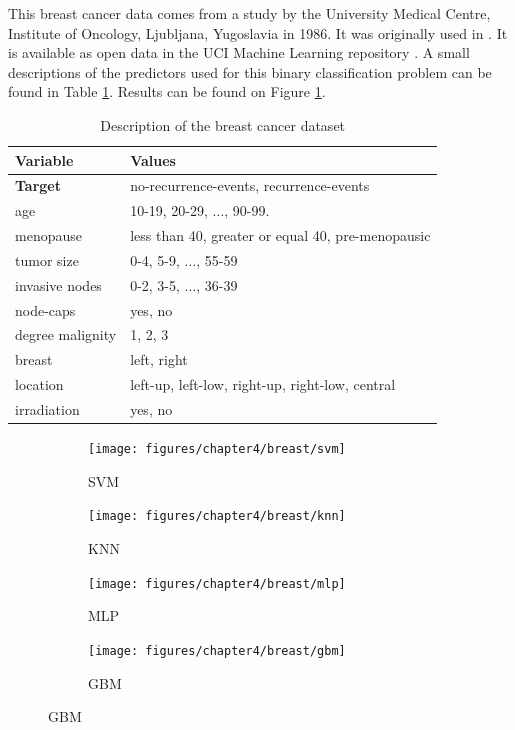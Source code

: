 \documentclass[10pt,a4paper,twoside]{book}
\begin{document}
This breast cancer data comes from a study by the University Medical Centre, Institute of Oncology, Ljubljana, Yugoslavia in 1986. It was originally used in \cite{Michalski1986}. It is available as open data in the UCI Machine Learning repository \cite{Lichman2013}. A small descriptions of the predictors used for this binary classification problem can be found in Table \ref{breastcancer}. Results can be found on Figure \ref{fig:breastcancer}.


\begin{table}[]
\centering
\caption{Description of the breast cancer dataset}
\label{breastcancer}
\begin{tabular}{@{}ll@{}}
\toprule
\textbf{Variable} & \textbf{Values}                                   \\ \midrule
\textbf{Target}   & no-recurrence-events, recurrence-events           \\
age               & 10-19, 20-29, $\dots$, 90-99.                         \\
menopause         & less than 40, greater or equal 40, pre-menopausic \\
tumor size        & 0-4, 5-9, $\dots$, 55-59                              \\
invasive nodes    & 0-2, 3-5, $\dots$, 36-39                              \\
node-caps         & yes, no                                           \\ 
degree malignity  & 1, 2, 3                                           \\
breast            & left, right                                       \\
location          & left-up, left-low, right-up, right-low, central   \\
irradiation       & yes, no\\
\midrule                                          
\end{tabular}
\end{table}

\begin{figure}[ht]
  \centering
  \caption{Benchmarking results for the breast cancer dataset.}
  \begin{subfigure}[t]{0.5\textwidth}
  	\caption{SVM}
    \centering\texttt{[image: figures/chapter4/breast/svm]}
  \end{subfigure}%
  \begin{subfigure}[t]{0.5\textwidth}
    \caption{KNN}
    \centering\texttt{[image: figures/chapter4/breast/knn]}
  \end{subfigure}
    \begin{subfigure}[t]{0.5\textwidth}
    \caption{MLP}
    \centering\texttt{[image: figures/chapter4/breast/mlp]}
  \end{subfigure}%
    \begin{subfigure}[t]{0.5\textwidth}
    \caption{GBM}
    \centering\texttt{[image: figures/chapter4/breast/gbm]}
  \end{subfigure}
  \label{fig:breastcancer}
\end{figure}
\end{document}
